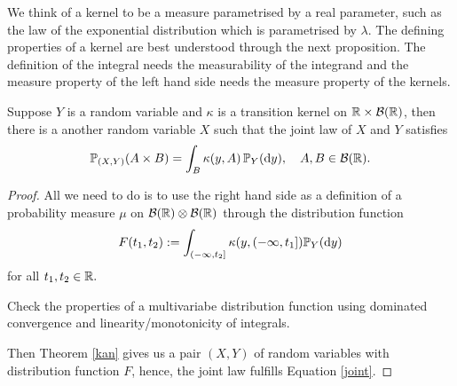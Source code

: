 We think of a kernel to be a measure parametrised by a real parameter, such as the law of the exponential distribution which is parametrised by $\lambda$. The defining properties of a kernel are best understood through the next proposition. The definition of the integral needs the measurability of the integrand and the measure property of the left hand side needs the measure property of the kernels.
\begin{laussagewerkzeug}
\begin{prop}
	Suppose $Y$ is a random variable and $\kappa$ is a transition kernel on $\R\times \mathcal B(\R)$, then there is a another random variable $X$ such that the joint law of $X$ and $Y$ satisfies
	\begin{align}\label{joint}
		\P_{(X,Y)}(A\times B)=\int_B \kappa(y,A) \,\P_Y(\mathrm d y),\quad A,B\in\mathcal B(\R).
	\end{align}
\end{prop}
\end{laussagewerkzeug}
\begin{proof}[Proof]
	All we need to do is to use the right hand side as a definition of a probability measure $\mu$ on $\mathcal B(\R)\otimes \mathcal B(\R)$ through the distribution function
	\begin{align*}
		F(t_1,t_2):= \int_{(-\infty,t_2]} \kappa(y,(-\infty,t_1]) \P_Y(\mathrm dy)
	\end{align*}	
	for all $t_1,t_2\in\R.$
	\begin{luebung}
		Check the properties of a multivariabe distribution function using dominated convergence and linearity/monotonicity of integrals.		
	\end{luebung}
	 Then Theorem \ref{kan} gives us a pair $(X,Y)$ of random variables with distribution function $F$, hence, the joint law fulfills Equation \eqref{joint}.
\end{proof}

